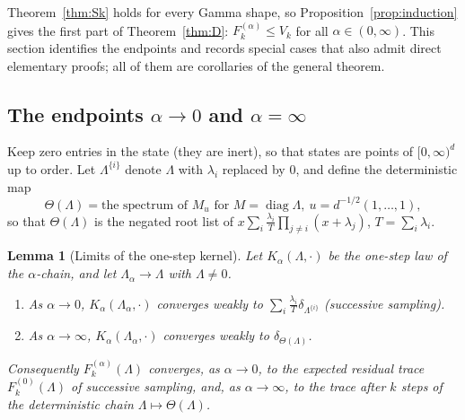 \documentclass[11pt,a4paper]{article}
\newtheorem{lemma}[theorem]{Lemma}
\theoremstyle{definition}
\newcommand{\diag}{\operatorname{diag}}
\begin{document}
Theorem~\ref{thm:Sk} holds for every Gamma shape, so Proposition~\ref{prop:induction} gives the first part of Theorem~\ref{thm:D}: $F^{(\alpha)}_k\le V_k$ for all $\alpha\in(0,\infty)$. This section identifies the endpoints and records special cases that also admit direct elementary proofs; all of them are corollaries of the general theorem.

\subsection{The endpoints $\alpha\to0$ and $\alpha=\infty$}
Keep zero entries in the state (they are inert), so that states are points of $[0,\infty)^d$ up to order. Let $\Lambda^{\{i\}}$ denote $\Lambda$ with $\lambda_i$ replaced by $0$, and define the deterministic map
\[
\Theta(\Lambda)=\text{the spectrum of }M_u\text{ for }M=\diag\Lambda,\ u=d^{-1/2}(1,\dots,1),
\]
so that $\Theta(\Lambda)$ is the negated root list of $x\sum_i\frac{\lambda_i}{T}\prod_{j\ne i}(x+\lambda_j)$, $T=\sum_i\lambda_i$.

\begin{lemma}[Limits of the one-step kernel]\label{lem:limits}
Let $K_\alpha(\Lambda,\cdot)$ be the one-step law of the $\alpha$-chain, and let $\Lambda_\alpha\to\Lambda$ with $\Lambda\ne0$.
\begin{enumerate}
\item[(i)] As $\alpha\to0$, $K_\alpha(\Lambda_\alpha,\cdot)$ converges weakly to $\sum_i\frac{\lambda_i}{T}\delta_{\Lambda^{\{i\}}}$ (successive sampling).
\item[(ii)] As $\alpha\to\infty$, $K_\alpha(\Lambda_\alpha,\cdot)$ converges weakly to $\delta_{\Theta(\Lambda)}$.
\end{enumerate}
Consequently $F^{(\alpha)}_k(\Lambda)$ converges, as $\alpha\to0$, to the expected residual trace $F^{(0)}_k(\Lambda)$ of successive sampling, and, as $\alpha\to\infty$, to the trace after $k$ steps of the deterministic chain $\Lambda\mapsto\Theta(\Lambda)$.
\end{lemma}
\end{document}
